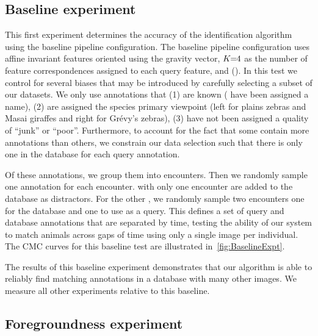     \subsection{Baseline experiment}\label{sub:exptbase}
      

        This first experiment determines the accuracy of the identification algorithm using the baseline pipeline
          configuration.
        The baseline pipeline configuration uses affine invariant features oriented using the gravity vector,
          $K\mkern-6mu=\mkern-6mu4$ as the number of feature correspondences assigned to each query feature, and \nscoring{}
          (\nsum{}).
        In this test we control for several biases that may be introduced by carefully selecting a subset of our
          datasets.
        We only use annotations that
        (1) are known (\ie{} have been assigned a name),
        (2) are assigned the species primary viewpoint (left for plains zebras and Masai giraffes and right for
          Grévy's zebras),
        (3) have not been assigned a quality of ``junk'' or ``poor''.
        Furthermore, to account for the fact that some \names{} contain more annotations than others, we
          constrain our data selection such that there is only one \groundtrue{} \exemplar{} in the database for
          each query annotation.

        Of these annotations, we group them into encounters.
        Then we randomly sample one annotation for each encounter.
        \Names{} with only one encounter are added to the database as distractors.
        For the other \names{}, we randomly sample two encounters one for the database and one to use as a query.
        This defines a set of query and database annotations that are separated by time, testing the ability of
          our system to match animals across gaps of time using only a single image per individual.
        The CMC curves for this baseline test are illustrated in~\cref{fig:BaselineExpt}.

        \BaselineExpt{}

        The results of this baseline experiment demonstrates that our algorithm is able to reliably find matching
          annotations in a database with many other images.
        We measure all other experiments relative to this baseline.

    \subsection{Foregroundness experiment}\label{sub:exptfeatmatchscore}

